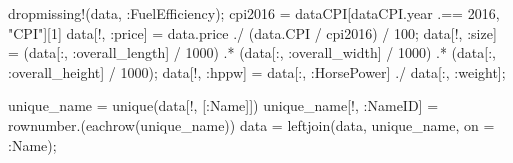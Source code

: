 \documentclass[
  letterpaper,
  DIV=11,
  numbers=noendperiod]{scrreprt}
\newenvironment{Shaded}{\begin{snugshade}}{\end{snugshade}}
\newcommand{\FloatTok}[1]{\textcolor[rgb]{0.68,0.00,0.00}{#1}}
\newcommand{\FunctionTok}[1]{\textcolor[rgb]{0.28,0.35,0.67}{#1}}
\newcommand{\NormalTok}[1]{\textcolor[rgb]{0.00,0.23,0.31}{#1}}
\newcommand{\OperatorTok}[1]{\textcolor[rgb]{0.37,0.37,0.37}{#1}}
\newcommand{\StringTok}[1]{\textcolor[rgb]{0.13,0.47,0.30}{#1}}
\begin{document}
\begin{Shaded}
\begin{Highlighting}[]
\FunctionTok{dropmissing!}\NormalTok{(data, }\OperatorTok{:}\NormalTok{FuelEfficiency);}
\NormalTok{cpi2016 }\OperatorTok{=}\NormalTok{ dataCPI[dataCPI.year }\OperatorTok{.==} \FloatTok{2016}\NormalTok{, }\StringTok{"CPI"}\NormalTok{][}\FloatTok{1}\NormalTok{]}
\NormalTok{data[!, }\OperatorTok{:}\NormalTok{price] }\OperatorTok{=}\NormalTok{ data.price }\OperatorTok{./}\NormalTok{ (data.CPI }\OperatorTok{/}\NormalTok{ cpi2016) }\OperatorTok{/} \FloatTok{100}\NormalTok{;}
\NormalTok{data[!, }\OperatorTok{:}\NormalTok{size] }\OperatorTok{=}\NormalTok{ (data[}\OperatorTok{:}\NormalTok{, }\OperatorTok{:}\NormalTok{overall\_length] }\OperatorTok{/} \FloatTok{1000}\NormalTok{) }\OperatorTok{.*}\NormalTok{ (data[}\OperatorTok{:}\NormalTok{, }\OperatorTok{:}\NormalTok{overall\_width] }\OperatorTok{/} \FloatTok{1000}\NormalTok{) }\OperatorTok{.*}\NormalTok{ (data[}\OperatorTok{:}\NormalTok{, }\OperatorTok{:}\NormalTok{overall\_height] }\OperatorTok{/} \FloatTok{1000}\NormalTok{);}
\NormalTok{data[!, }\OperatorTok{:}\NormalTok{hppw] }\OperatorTok{=}\NormalTok{ data[}\OperatorTok{:}\NormalTok{, }\OperatorTok{:}\NormalTok{HorsePower] }\OperatorTok{./}\NormalTok{ data[}\OperatorTok{:}\NormalTok{, }\OperatorTok{:}\NormalTok{weight];}

\NormalTok{unique\_name }\OperatorTok{=} \FunctionTok{unique}\NormalTok{(data[!, [}\OperatorTok{:}\NormalTok{Name]])}
\NormalTok{unique\_name[!, }\OperatorTok{:}\NormalTok{NameID] }\OperatorTok{=} \FunctionTok{rownumber}\NormalTok{.(}\FunctionTok{eachrow}\NormalTok{(unique\_name))}
\NormalTok{data }\OperatorTok{=} \FunctionTok{leftjoin}\NormalTok{(data, unique\_name, on }\OperatorTok{=} \OperatorTok{:}\NormalTok{Name);}


\end{Highlighting}
\end{Shaded}
\end{document}
